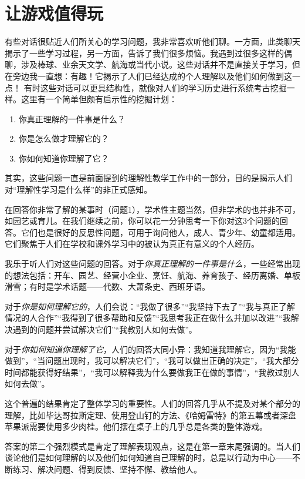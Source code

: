 \chapter{让游戏值得玩}
有些对话很贴近人们所关心的学习问题，我非常喜欢听他们聊。一方面，此类聊天揭示了一些学习过程，另一方面，告诉了我们很多烦恼。我遇到过很多这样的偶聊，涉及棒球、业余天文学、航海或当代小说。这些对话并不是直接关于学习，但在旁边我一直想：有趣！它揭示了人们已经达成的个人理解以及他们如何做到这一点！
有时这些对话可以更具结构性，就像对人们的学习历史进行系统考古挖掘一样。这里有一个简单但颇有启示性的挖掘计划：
\begin{enumerate}
    \item 你真正理解的一件事是什么？
    \item 你是怎么做才理解它的？
    \item 你如何知道你理解了它？
\end{enumerate}

其实，这些问题一直是前面提到的理解性教学工作中的一部分，目的是揭示人们对“理解性学习是什么样”的非正式感知。

在回答你非常了解的某事时（问题1），学术性主题当然，但非学术的也并非不可，如园艺或育儿。在我们继续之前，你可以花一分钟思考一下你对这3个问题的回答。它们也是很好的反思性问题，可用于询问他人，成人、青少年、幼童都适用。它们聚焦于人们在学校和课外学习中的被认为真正有意义的个人经历。

我乐于听人们对这些问题的回答。对于\textit{你真正理解的一件事是什么}，一些经常出现的想法包括：开车、园艺、经营小企业、烹饪、航海、养育孩子、经历离婚、单板滑雪；有时是学术话题——代数、大萧条史、西班牙语。

对于\textit{你是如何理解它的}，人们会说：“我做了很多”“我坚持下去了”“我与真正了解情况的人合作”“我得到了很多帮助和反馈”“我思考我正在做什么并加以改进”“我解决遇到的问题并尝试解决它们”“我教别人如何去做”。

对于\textit{你如何知道你理解了它}，人们的回答大同小异：我知道我理解它，因为“我能做到”，“当问题出现时，我可以解决它们”，“我可以做出正确的决定”，“我大部分时间都能获得好结果”，“我可以解释我为什么要做我正在做的事情”，“我教过别人如何去做”。

这个普遍的结果肯定了整体学习的重要性。人们的回答几乎从不提及对某个部分的理解，比如毕达哥拉斯定理、使用登山钉的方法、《哈姆雷特》的第五幕或者深盘苹果派需要使用多少肉桂。他们摆在桌子上的几乎总是各类的整体游戏。

答案的第二个强烈模式是肯定了理解表现观点，这是在第一章末尾强调的。当人们谈论他们是如何理解的以及他们如何知道自己理解的时，总是以行动为中心——不断练习、解决问题、得到反馈、坚持不懈、教给他人。

